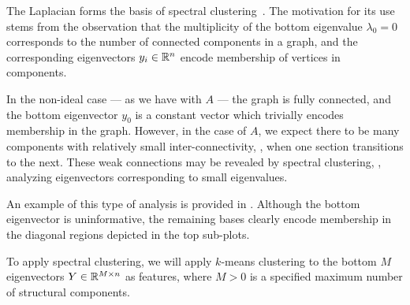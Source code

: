 \documentclass{article}
\begin{document}
The Laplacian forms the basis of spectral clustering~\cite{von2007tutorial}.  The
motivation for its use stems from the observation that the multiplicity of the bottom
eigenvalue $\lambda_0 = 0$ corresponds to the number of connected components in a
graph, and the corresponding eigenvectors $y_i \in \mathbb{R}^n$ encode membership of vertices
in components.

In the non-ideal case --- as we have with $A$ --- the graph is fully connected, and
the bottom eigenvector $y_0$ is a constant vector which trivially encodes membership 
in the graph.  However, in the case of $A$, we expect there to be many components
with relatively small inter-connectivity, \ie, when one section transitions to the
next.  These weak connections may be revealed by spectral clustering, \ie, analyzing 
eigenvectors corresponding to small eigenvalues.

An example of this type of analysis is provided in .  Although the
bottom eigenvector is uninformative, the remaining bases clearly encode membership in
the diagonal regions depicted in the top sub-plots.

To apply spectral clustering, we will apply $k$-means clustering to the bottom $M$ 
eigenvectors $Y \in \mathbb{R}^{M \times n}$ as features, where $M > 0$ is a specified maximum 
number of structural components.

\end{document}
